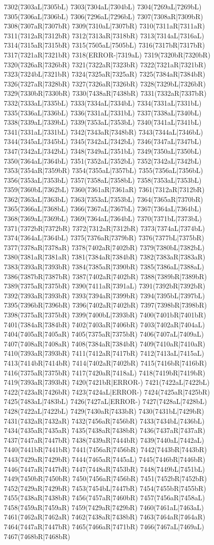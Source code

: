 7302(7303aL|7305bL) 7303(7304aL|7304bL) 7304(7269aL|7269bL) 7305(7306aL|7306bL) 7306(7296aL|7296bL) 7307(7308aR|7309bR) 7308(7307aR|7307bR) 7309(7310aL|7307bR) 7310(7311aR|7311aR) 7311(7312aR|7312bR) 7312(7313aR|7318bR) 7313(7314aL|7316aL) 7314(7315aR|7315bR) 7315(7505aL|7505bL) 7316(7317bR|7317bR) 7317(7321aR|7321bR) 7318(ERROR-|7319aL) 7319(7320bR|7320bR) 7320(7326aR|7326bR) 7321(7322aR|7323bR) 7322(7321aR|7321bR) 7323(7324bL|7321bR) 7324(7325aR|7325aR) 7325(7384aR|7384bR) 7326(7327aR|7328bR) 7327(7326aR|7326bR) 7328(7329bL|7326bR) 7329(7330bR|7330bR) 7330(7438aR|7438bR) 7331(7332aR|7337bR) 7332(7333aL|7335bL) 7333(7334aL|7334bL) 7334(7331aL|7331bL) 7335(7336aL|7336bL) 7336(7331aL|7331bL) 7337(7338aL|7340bL) 7338(7339aL|7339bL) 7339(7353aL|7353bL) 7340(7341aL|7341bL) 7341(7331aL|7331bL) 7342(7343aR|7348bR) 7343(7344aL|7346bL) 7344(7345aL|7345bL) 7345(7342aL|7342bL) 7346(7347aL|7347bL) 7347(7342aL|7342bL) 7348(7349aL|7351bL) 7349(7350aL|7350bL) 7350(7364aL|7364bL) 7351(7352aL|7352bL) 7352(7342aL|7342bL) 7353(7354aR|7359bR) 7354(7355aL|7357bL) 7355(7356aL|7356bL) 7356(7353aL|7353bL) 7357(7358aL|7358bL) 7358(7353aL|7353bL) 7359(7360bL|7362bL) 7360(7361aR|7361aR) 7361(7312aR|7312bR) 7362(7363aL|7363bL) 7363(7353aL|7353bL) 7364(7365aR|7370bR) 7365(7366aL|7368bL) 7366(7367aL|7367bL) 7367(7364aL|7364bL) 7368(7369aL|7369bL) 7369(7364aL|7364bL) 7370(7371bL|7373bL) 7371(7372bR|7372bR) 7372(7312aR|7312bR) 7373(7374aL|7374bL) 7374(7364aL|7364bL) 7375(7376aR|7379bR) 7376(7377bL|7375bR) 7377(7378aR|7378aR) 7378(7402aR|7402bR) 7379(7380bL|7382bL) 7380(7381aR|7381aR) 7381(7384aR|7384bR) 7382(7383aR|7383aR) 7383(7393aR|7393bR) 7384(7385aR|7390bR) 7385(7386aL|7388aL) 7386(7387bR|7387bR) 7387(7402aR|7402bR) 7388(7389bR|7389bR) 7389(7375aR|7375bR) 7390(7411aR|7391aL) 7391(7392bR|7392bR) 7392(7393aR|7393bR) 7393(7394aR|7399bR) 7394(7395bL|7397bL) 7395(7396bR|7396bR) 7396(7402aR|7402bR) 7397(7398bR|7398bR) 7398(7375aR|7375bR) 7399(7400bL|7393bR) 7400(7401bR|7401bR) 7401(7384aR|7384bR) 7402(7403aR|7406bR) 7403(7402aR|7404aL) 7404(7405aR|7405aR) 7405(7375aR|7375bR) 7406(7407aL|7409aL) 7407(7408aR|7408aR) 7408(7384aR|7384bR) 7409(7410aR|7410aR) 7410(7393aR|7393bR) 7411(7412aR|7417bR) 7412(7413aL|7415aL) 7413(7414bR|7414bR) 7414(7402aR|7402bR) 7415(7416bR|7416bR) 7416(7375aR|7375bR) 7417(7420aR|7418aL) 7418(7419bR|7419bR) 7419(7393aR|7393bR) 7420(7421bR|ERROR-) 7421(7422aL|7422bL) 7422(7423aR|7426bR) 7423(7424aL|ERROR-) 7424(7425aR|7425bR) 7425(7483aL|7483bL) 7426(7427aL|ERROR-) 7427(7428aL|7428bL) 7428(7422aL|7422bL) 7429(7430aR|7433bR) 7430(7431bL|7429bR) 7431(7432aR|7432aR) 7432(7456aR|7456bR) 7433(7434bL|7436bL) 7434(7435aR|7435aR) 7435(7438aR|7438bR) 7436(7437aR|7437aR) 7437(7447aR|7447bR) 7438(7439aR|7444bR) 7439(7440aL|7442aL) 7440(7441bR|7441bR) 7441(7456aR|7456bR) 7442(7443bR|7443bR) 7443(7429aR|7429bR) 7444(7465aR|7445aL) 7445(7446bR|7446bR) 7446(7447aR|7447bR) 7447(7448aR|7453bR) 7448(7449bL|7451bL) 7449(7450bR|7450bR) 7450(7456aR|7456bR) 7451(7452bR|7452bR) 7452(7429aR|7429bR) 7453(7454bL|7447bR) 7454(7455bR|7455bR) 7455(7438aR|7438bR) 7456(7457aR|7460bR) 7457(7456aR|7458aL) 7458(7459aR|7459aR) 7459(7429aR|7429bR) 7460(7461aL|7463aL) 7461(7462aR|7462aR) 7462(7438aR|7438bR) 7463(7464aR|7464aR) 7464(7447aR|7447bR) 7465(7466aR|7471bR) 7466(7467aL|7469aL) 7467(7468bR|7468bR) 